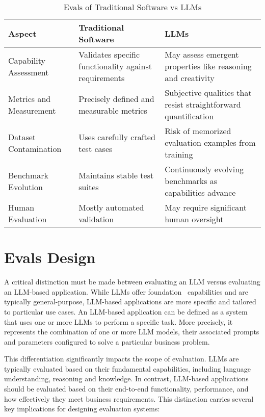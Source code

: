 \begin{table}[h]
\caption{Evals of Traditional Software vs LLMs}
\label{evals-table}
\begin{tabular}{p{}p{}p{}}
\hline
\textbf{Aspect} & \textbf{Traditional Software} & \textbf{LLMs} \\
\hline
Capability Assessment & Validates specific functionality against requirements & May assess emergent properties like reasoning and creativity \\
\hline
Metrics and Measurement & Precisely defined and measurable metrics & Subjective qualities that resist straightforward quantification \\
\hline
Dataset Contamination & Uses carefully crafted test cases & Risk of memorized evaluation examples from training \\
\hline
Benchmark Evolution & Maintains stable test suites & Continuously evolving benchmarks as capabilities advance \\
\hline
Human Evaluation & Mostly automated validation & May require significant human oversight \\
\hline
\end{tabular}
\end{table}

\section{Evals Design}

A critical distinction must be made between evaluating an LLM versus evaluating an LLM-based application. While LLMs offer foundation~ capabilities and are typically general-purpose, LLM-based applications are more specific and tailored to particular use cases. An LLM-based application can be defined as a system that uses one or more LLMs to perform a specific task. More precisely, it represents the combination of one or more LLM models, their associated prompts and parameters configured to solve a particular business problem.

This differentiation significantly impacts the scope of evaluation. LLMs are typically evaluated based on their fundamental capabilities, including language understanding, reasoning and knowledge. In contrast, LLM-based applications should be evaluated based on their end-to-end functionality, performance, and how effectively they meet business requirements. This distinction carries several key implications for designing evaluation systems:

